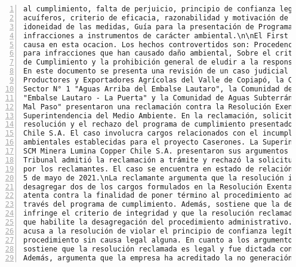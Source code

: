 \begin{Verbatim}[frame=lines, label=Elavoración propia -  Ejemplo de Contexto enviado por el Chatbot a OpenAI
				, fontsize=\footnotesize, numbers=left
				, baselinestretch=0.4
				, formatcom=\color{gray}]
al cumplimiento, falta de perjuicio, principio de confianza legitima, calidad de aguas,
acuíferos, criterio de eficacia, razonabilidad y motivación de la resolución de la SMA,
idoneidad de las medidas, Guía para la presentación de Programas de Cumplimiento por
infracciones a instrumentos de carácter ambiental.\n\nEl First Environmental Court Rechaza la
causa en esta ocacion. Los hechos controvertidos son: Procedencia del Programa de Cumplimiento
para infracciones que han causado daño ambiental, Sobre el criterio de eficacia del Programa
de Cumplimiento y la prohibición general de eludir a la responsabilidad.\n\nY el resumen es:
En este documento se presenta una revisión de un caso judicial en el que la Asociación de
Productores y Exportadores Agrícolas del Valle de Copiapó, la Comunidad de Aguas Subterráneas
Sector N° 1 "Aguas Arriba del Embalse Lautaro", la Comunidad de Aguas Subterráneas Sector N°2
"Embalse Lautaro - La Puerta" y la Comunidad de Aguas Subterráneas Sector N° 3 "La Puerta -
Mal Paso" presentaron una reclamación contra la Resolución Exenta Nº 15/Rol D-018-2019 de la
Superintendencia del Medio Ambiente. En la reclamación, solicitan la invalidación de la
resolución y el rechazo del programa de cumplimiento presentado por SCM Minera Lumina Copper
Chile S.A. El caso involucra cargos relacionados con el incumplimiento de condiciones
ambientales establecidas para el proyecto Caserones. La Superintendencia del Medio Ambiente y
SCM Minera Lumina Copper Chile S.A. presentaron sus argumentos en contra de la reclamación. El
Tribunal admitió la reclamación a trámite y rechazó la solicitud de medida cautelar presentada
por los reclamantes. El caso se encuentra en estado de relación y se llevó a cabo una vista el
5 de mayo de 2021.\nLa reclamante argumenta que la resolución impugnada infringe la ley al
desagregar dos de los cargos formulados en la Resolución Exenta N° 1/D-018-2019, lo cual
atenta contra la finalidad de poner término al procedimiento administrativo sancionador a
través del programa de cumplimiento. Además, sostiene que la desagregación de los cargos
infringe el criterio de integridad y que la resolución reclamada carece de una causal legal
que habilite la desagregación del procedimiento administrativo. Por otro lado, la reclamante
acusa a la resolución de violar el principio de confianza legítima al desagregar el
procedimiento sin causa legal alguna. En cuanto a los argumentos de la reclamada, esta
sostiene que la resolución reclamada es legal y fue dictada conforme a la normativa vigente.
Además, argumenta que la empresa ha acreditado la no generación de efectos negativos en

\end{Verbatim}
